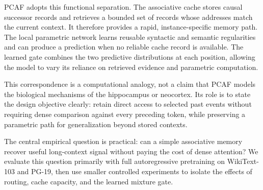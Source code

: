 \documentclass[11pt]{article}
\begin{document}
PCAF adopts this functional separation. The associative cache stores causal
successor records and retrieves a bounded set of records whose addresses match
the current context. It therefore provides a rapid, instance-specific memory
path. The local parametric network learns reusable syntactic and semantic
regularities and can produce a prediction when no reliable cache record is
available. The learned gate combines the two predictive distributions at each
position, allowing the model to vary its reliance on retrieved evidence and
parametric computation.

This correspondence is a computational analogy, not a claim that PCAF models
the biological mechanisms of the hippocampus or neocortex. Its role is to state
the design objective clearly: retain direct access to selected past events
without requiring dense comparison against every preceding token, while
preserving a parametric path for generalization beyond stored contexts.

The central empirical question is practical: can a simple associative memory
recover useful long-context signal without paying the cost of dense attention?
We evaluate this question primarily with full autoregressive pretraining on
WikiText-103 and PG-19, then use smaller controlled experiments to isolate
the effects of routing, cache capacity, and the learned mixture gate.
\end{document}
